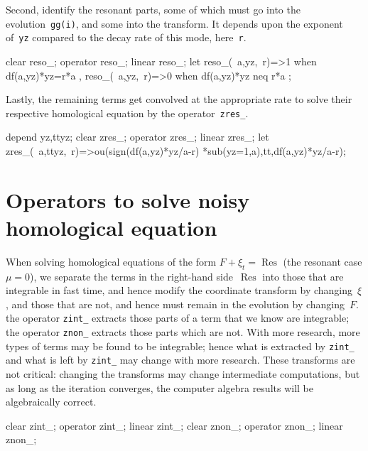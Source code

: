 \documentclass[11pt,a5paper]{article}
\newcommand{\res}{\operatorname{Res}}
\begin{document}
Second, identify the resonant parts, some of which must go
into the evolution~\verb|gg(i)|, and some into the
transform. It depends upon the exponent of~\verb|yz|
compared to the decay rate of this mode, here~\verb|r|.
\begin{reduce}
clear reso_; operator reso_; linear reso_;
let { reso_(~a,yz,~r)=>1 when df(a,yz)*yz=r*a
    , reso_(~a,yz,~r)=>0 when df(a,yz)*yz neq r*a
    };
\end{reduce}

Lastly, the remaining terms get convolved at the appropriate
rate to solve their respective homological equation by the
operator~\verb|zres_|.
\begin{reduce}
depend yz,ttyz;
clear zres_; operator zres_; linear zres_;
let zres_(~a,ttyz,~r)=>ou(sign(df(a,yz)*yz/a-r)
    *sub(yz=1,a),tt,df(a,yz)*yz/a-r);
\end{reduce}




\section{Operators to solve noisy homological equation}

When solving homological equations of the form
$F+\xi_t=\res$ (the resonant case $\mu=0$), we separate the
terms in the right-hand side~$\res$ into those that are
integrable in fast time, and hence modify the coordinate
transform by changing~$\xi$, and those that are not, and
hence must remain in the evolution by changing~$F$.  the
operator \verb|zint_| extracts those parts of a term that we
know are integrable; the operator \verb|znon_| extracts
those parts which are not. With more research, more types of
terms may be found to be integrable; hence what is extracted
by \verb|zint_| and what is left by \verb|zint_| may change
with more research. These transforms are not critical:
changing the transforms may change intermediate
computations, but as long as the iteration converges, the
computer algebra results will be algebraically correct.
\begin{reduce}
clear zint_; operator zint_; linear zint_;
clear znon_; operator znon_; linear znon_;
\end{reduce}
\end{document}

